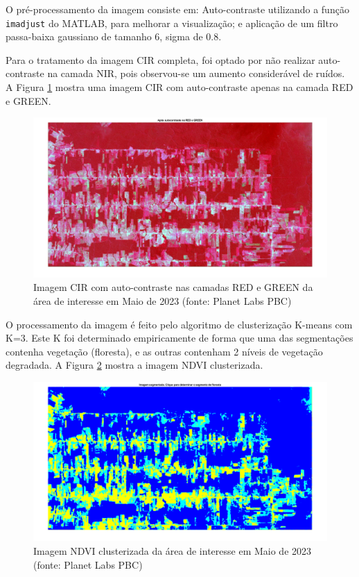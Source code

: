 \documentclass[11pt]{article}
\begin{document}
O pré-processamento da imagem consiste em: Auto-contraste utilizando a função \verb|imadjust| do MATLAB, para melhorar a visualização; e aplicação de um filtro passa-baixa gaussiano de tamanho 6, sigma de 0.8.

Para o tratamento da imagem CIR completa, foi optado por não realizar auto-contraste na camada NIR, pois observou-se um aumento considerável de ruídos. A Figura \ref{fig:candeias_maio_2023_cir_contrast} mostra uma imagem CIR com auto-contraste apenas na camada RED e GREEN.

\begin{figure}[!htb]
	\centering
	\includegraphics[width=.9\textwidth]{candeias_maio_2023_cir_contrast.png}
	\caption{Imagem CIR com auto-contraste nas camadas RED e GREEN da área de interesse em Maio de 2023 (fonte: Planet Labs PBC)}
	\label{fig:candeias_maio_2023_cir_contrast}
\end{figure}

O processamento da imagem é feito pelo algoritmo de clusterização K-means com K=3. Este K foi determinado empiricamente de forma que uma das segmentações contenha vegetação (floresta), e as outras contenham 2 níveis de vegetação degradada. A Figura \ref{fig:candeias_maio_2023_ndvi_clusters} mostra a imagem NDVI clusterizada.

\begin{figure}[!htb]
	\centering
	\includegraphics[width=.9\textwidth]{candeias_maio_2023_ndvi_clusters.png}
	\caption{Imagem NDVI clusterizada da área de interesse em Maio de 2023 (fonte: Planet Labs PBC)}
	\label{fig:candeias_maio_2023_ndvi_clusters}
\end{figure}
\end{document}
